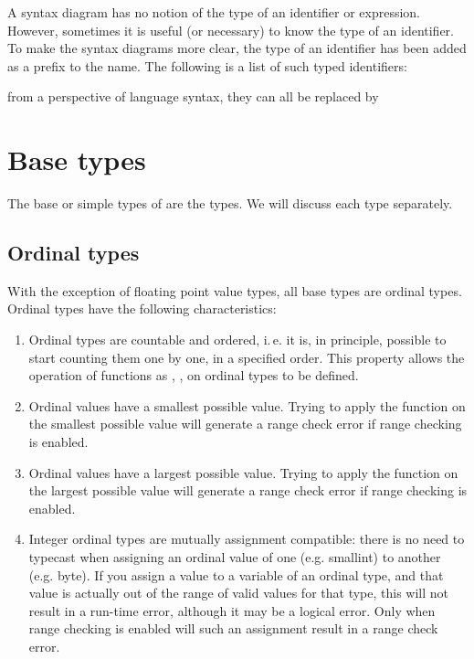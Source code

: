 A syntax diagram has no notion of the type of an identifier or expression.
However, sometimes it is useful (or necessary) to know the type of an identifier.
To make the syntax diagrams more clear, the type of an identifier has been added as a 
prefix to the name. The following is a list of such typed identifiers:

from a perspective of language syntax, they can all be replaced by 

\section{Base types}
The base or simple types of \fpc are the \delphi types.
We will discuss each type separately.

\subsection{Ordinal types}
With the exception of floating point value types, all base types are ordinal
types. Ordinal types have the following characteristics:
\begin{enumerate}
\item Ordinal types are countable and ordered, i.\,e. it is, in principle,
possible to start counting them one by one, in a specified order.
This property allows the operation of functions as , ,
on ordinal types to be defined.
\item Ordinal values have a smallest possible value. Trying to apply the
 function on the smallest possible value will generate a range
check error if range checking is enabled.
\item Ordinal values have a largest possible value. Trying to apply the
 function on the largest possible value will generate a range
check error if range checking is enabled.
\item Integer ordinal types are mutually assignment compatible: there is no need to
typecast when assigning an ordinal value of one (e.g. smallint) to another
(e.g. byte). If you assign a value to a variable of an ordinal type, 
and that value is actually out of the range of valid values for that type, 
this will not result in a run-time error, although it may be a logical error. 
Only when range checking is enabled will such an assignment result in a range
check error.
\end{enumerate}

